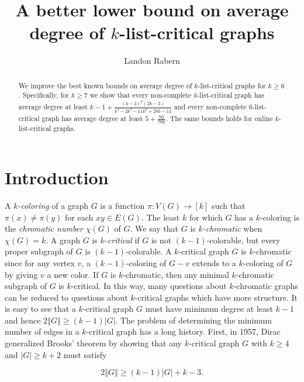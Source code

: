 \documentclass[10pt]{article}
\title{A better lower bound on average degree of $k$-list-critical graphs}
\author{Landon Rabern}
\theoremstyle{plain}
\theoremstyle{definition}
\theoremstyle{remark}
\newcommand{\card}[1]{\left|#1\right|}
\newcommand{\size}[1]{\left\Vert#1\right\Vert}
\newcommand{\func}[3]{#1\colon #2 \rightarrow #3}
\newcommand{\irange}[1]{\left[#1\right]}
\begin{document}
\maketitle

\begin{abstract}
		We improve the best known bounds on average degree of $k$-list-critical graphs for $k \ge 6$. 
		Specifically, for $k \ge 7$ we show that every non-complete $k$-list-critical graph has average degree at least $k-1 + \frac{(k-3)^2 (2 k-3)}{k^4-2 k^3-11 k^2+28 k-14}$
		and every non-complete $6$-list-critical graph has average degree at least $5 + \frac{93}{766}$.
		The same bounds holds for online $k$-list-critical graphs.
\end{abstract}

\section{Introduction}

A \emph{$k$-coloring} of a graph $G$ is a function $\func{\pi}{V(G)}{\irange{k}}$ such that $\pi(x) \ne \pi(y)$ for each $xy \in E(G)$.  
The least $k$ for which $G$ has a $k$-coloring is the \emph{chromatic number} $\chi(G)$ of $G$. We say that $G$ is \emph{$k$-chromatic} when $\chi(G) = k$.  
A graph $G$ is \emph{$k$-critical} if $G$ is not $(k-1)$-colorable, but every proper subgraph of $G$ is $(k-1)$-colorable. A $k$-critical graph $G$ is $k$-chromatic 
since for any vertex $v$, a $(k-1)$-coloring of $G-v$ extends to a $k$-coloring of $G$ by giving $v$ a new color.  If $G$ is $k$-chromatic, then any minimal $k$-chromatic 
subgraph of $G$ is $k$-critical.  In this way, many questions about $k$-chromatic graphs can be reduced to questions about $k$-critical graphs which have more structure.  
It is easy to see that a $k$-critical graph $G$ must have minimum degree at least $k-1$ and hence $2\size{G} \ge (k-1)\card{G}$.  
The problem of determining the minimum number of edges in a $k$-critical graph has a long history. 
First, in 1957, Dirac \cite{dirac1957theorem} generalized Brooks' theorem \cite{brooks1941colouring} by showing that any $k$-critical graph $G$ 
with $k \ge 4$ and $\card{G} \ge k+2$ must satisfy 

\[2\size{G} \ge (k-1)\card{G} + k-3.\]
\end{document}
